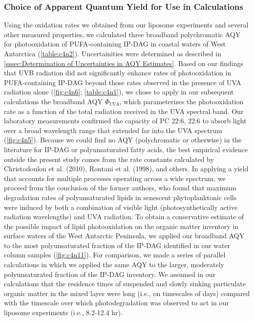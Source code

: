 \subsubsection{Choice of Apparent Quantum Yield for Use in Calculations}

Using the oxidation rates we obtained from our liposome experiments and several other measured properties, we calculated three broadband polychromatic AQY for photooxidation of PUFA-containing IP-DAG in coastal waters of West Antarctica (\autoref{table:c4n2}). Uncertainities were determined as described in \autoref{sssec:Determination of Uncertainties in AQY Estimates}. Based on our findings that UVB radiation did not significantly enhance rates of photooxidation in PUFA-containing IP-DAG beyond those rates observed in the presence of UVA radiation alone (\autoref{fig:c4n6}; \autoref{table:c4n1}), we chose to apply in our subsequent calculations the broadband AQY ${\Phi _{UVA}}$, which parameterizes the photooxidation rate as a function of the total radiation received in the UVA spectral band. Our laboratory measurements confirmed the capacity of PC 22:6, 22:6 to absorb light over a broad wavelength range that extended far into the UVA spectrum (\autoref{fig:c4n5}). Because we could find no AQY (polychromatic or otherwise) in the literature for IP-DAG or polyunsaturated fatty acids, the best empirical evidence outside the present study comes from the rate constants calculated by Christodoulou et al. (2010), Rontani et al. (1998), and others. In applying a yield that accounts for multiple processes operating across a wide spectrum, we proceed from the conclusion of the former authors, who found that maximum degradation rates of polyunsaturated lipids in senescent phytoplanktonic cells were induced by both a combination of visible light (photosynthetically active radiation wavelengths) and UVA radiation. To obtain a conservative estimate of the possible impact of lipid photooxidation on the organic matter inventory in surface waters of the West Antarctic Peninsula, we applied our broadband AQY to the most polyunsaturated fraction of the IP-DAG identified in our water column samples (\autoref{fig:c4n11}). For comparison, we made a series of parallel calculations in which we applied the same AQY to the larger, moderately polyunsaturated fraction of the IP-DAG inventory. We assumed in our calculations that the residence times of suspended and slowly sinking particulate organic matter in the mixed layer were long (i.e., on timescales of days) compared with the timescale over which photodegradation was observed to act in our liposome experiments (i.e., 8.2-12.4 hr).
